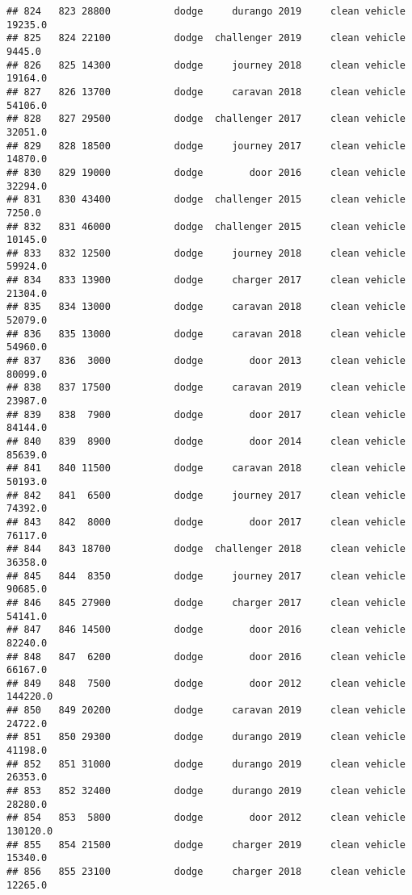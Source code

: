 \documentclass[
]{article}
\begin{document}
\begin{verbatim}
## 824   823 28800           dodge     durango 2019     clean vehicle   19235.0
## 825   824 22100           dodge  challenger 2019     clean vehicle    9445.0
## 826   825 14300           dodge     journey 2018     clean vehicle   19164.0
## 827   826 13700           dodge     caravan 2018     clean vehicle   54106.0
## 828   827 29500           dodge  challenger 2017     clean vehicle   32051.0
## 829   828 18500           dodge     journey 2017     clean vehicle   14870.0
## 830   829 19000           dodge        door 2016     clean vehicle   32294.0
## 831   830 43400           dodge  challenger 2015     clean vehicle    7250.0
## 832   831 46000           dodge  challenger 2015     clean vehicle   10145.0
## 833   832 12500           dodge     journey 2018     clean vehicle   59924.0
## 834   833 13900           dodge     charger 2017     clean vehicle   21304.0
## 835   834 13000           dodge     caravan 2018     clean vehicle   52079.0
## 836   835 13000           dodge     caravan 2018     clean vehicle   54960.0
## 837   836  3000           dodge        door 2013     clean vehicle   80099.0
## 838   837 17500           dodge     caravan 2019     clean vehicle   23987.0
## 839   838  7900           dodge        door 2017     clean vehicle   84144.0
## 840   839  8900           dodge        door 2014     clean vehicle   85639.0
## 841   840 11500           dodge     caravan 2018     clean vehicle   50193.0
## 842   841  6500           dodge     journey 2017     clean vehicle   74392.0
## 843   842  8000           dodge        door 2017     clean vehicle   76117.0
## 844   843 18700           dodge  challenger 2018     clean vehicle   36358.0
## 845   844  8350           dodge     journey 2017     clean vehicle   90685.0
## 846   845 27900           dodge     charger 2017     clean vehicle   54141.0
## 847   846 14500           dodge        door 2016     clean vehicle   82240.0
## 848   847  6200           dodge        door 2016     clean vehicle   66167.0
## 849   848  7500           dodge        door 2012     clean vehicle  144220.0
## 850   849 20200           dodge     caravan 2019     clean vehicle   24722.0
## 851   850 29300           dodge     durango 2019     clean vehicle   41198.0
## 852   851 31000           dodge     durango 2019     clean vehicle   26353.0
## 853   852 32400           dodge     durango 2019     clean vehicle   28280.0
## 854   853  5800           dodge        door 2012     clean vehicle  130120.0
## 855   854 21500           dodge     charger 2019     clean vehicle   15340.0
## 856   855 23100           dodge     charger 2018     clean vehicle   12265.0

\end{verbatim}
\end{document}
